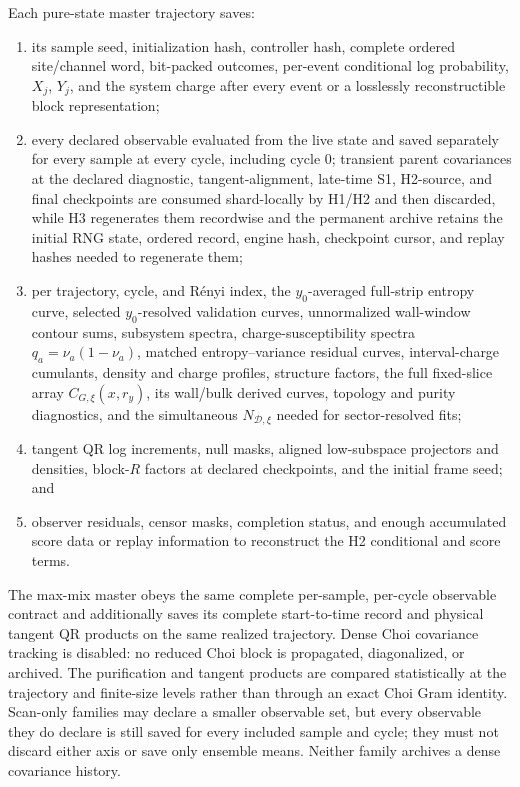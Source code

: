 \documentclass[aps,prx,twocolumn,floatfix,nofootinbib,superscriptaddress,longbibliography]{revtex4-2}
\begin{document}
Each pure-state master trajectory saves:
\begin{enumerate}
\item its sample seed, initialization hash, controller hash, complete ordered site/channel
word, bit-packed outcomes, per-event conditional log probability, $X_j$, $Y_j$, and the
system charge after every event or a losslessly reconstructible block representation;
\item every declared observable evaluated from the live state and saved separately for
every sample at every cycle, including cycle 0; transient parent covariances at the
declared diagnostic, tangent-alignment, late-time S1, H2-source, and final checkpoints are
consumed shard-locally by H1/H2 and then discarded, while H3 regenerates them recordwise and the permanent
archive retains the initial RNG state, ordered record, engine hash, checkpoint cursor, and
replay hashes needed to regenerate them;
\item per trajectory, cycle, and R\'enyi index, the $y_0$-averaged full-strip entropy
curve, selected $y_0$-resolved validation curves, unnormalized wall-window contour sums,
subsystem spectra, charge-susceptibility spectra $q_a=\nu_a(1-\nu_a)$, matched
entropy--variance residual curves, interval-charge cumulants, density and charge profiles, structure
factors, the full fixed-slice array $C_{G,\xi}(x,r_y)$, its wall/bulk derived curves,
topology and purity diagnostics, and the simultaneous
$N_{\mathcal D,\xi}$ needed for sector-resolved fits;
\item tangent QR log increments, null masks, aligned low-subspace projectors and densities,
block-$R$ factors at declared checkpoints, and the initial frame seed; and
\item observer residuals, censor masks, completion status, and enough accumulated score data
or replay information to reconstruct the H2 conditional and score terms.
\end{enumerate}
The max-mix master obeys the same complete per-sample, per-cycle observable contract and
additionally saves its complete start-to-time record and physical tangent QR products on
the same realized trajectory.  Dense Choi covariance tracking is disabled: no reduced
Choi block is propagated, diagonalized, or archived.  The purification and tangent
products are compared statistically at the trajectory and finite-size levels rather than
through an exact Choi Gram identity.  Scan-only families may declare a smaller observable
set, but every observable they do declare is still saved for every included sample and
cycle; they must not discard either axis or save only ensemble means.  Neither family
archives a dense covariance history.
\end{document}

